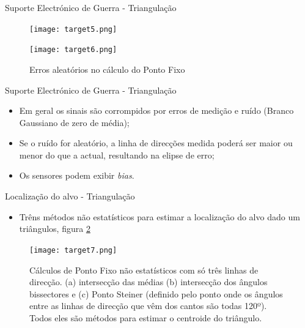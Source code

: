 \documentclass[portuguese,10pt]{beamer}
\begin{document}
\begin{frame}{Suporte Electrónico de Guerra - Triangulação}
    \begin{figure}[ht]
        \begin{minipage}[b]{0.49\linewidth}
            \centering
            \texttt{[image: target5.png]}
            \caption{Triangulação}
            \label{target5}
        \end{minipage}
        \hspace{\fill}
        \begin{minipage}[b]{0.49\linewidth}
            \centering
            \texttt{[image: target6.png]}
            \caption{Erros aleatórios no cálculo do Ponto Fixo}
            \label{target6}
        \end{minipage}
    \end{figure}
\end{frame}


\begin{frame}{Suporte Electrónico de Guerra - Triangulação}
   
    \begin{itemize}
        \item Em geral os sinais são corrompidos por erros de medição e ruído (Branco Gaussiano de zero de média);
      \vspace*{5mm}
        \item Se o ruído for aleatório, a linha de direcções medida poderá ser maior ou menor do que a actual, resultando na elipse de erro;
        \vspace*{5mm}
        \item Os sensores podem exibir \textit{bias}.
    \end{itemize}
\end{frame}

    \begin{frame}{Localização do alvo - Triangulação}
   
    \begin{itemize}
        \item Trêns métodos não estatísticos para estimar a localização do alvo dado um triângulos, figura \ref{target7} 
    \end{itemize}
    \begin{figure}[ht]
\centering
\texttt{[image: target7.png]}
\caption{Cálculos de Ponto Fixo não estatísticos com só três linhas de direcção. (a) intersecção das médias (b) intersecção dos ângulos bissectores e (c) Ponto Steiner (definido pelo ponto onde os ângulos entre as linhas de direcção que vêm dos cantos são todas 120º). Todos eles são métodos para estimar o centroide do triângulo.}
\label{target7}
\end{figure}
\end{frame}
\end{document}
